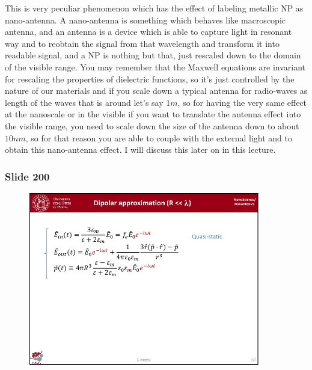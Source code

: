 \documentclass[../main/main.tex]{subfiles}
\begin{document}
This is very peculiar phenomenon which has the effect of labeling metallic NP as nano-antenna. A nano-antenna is something which behaves like macroscopic antenna, and an antenna is a device which is able to capture light in resonant way and to reobtain the signal from that wavelength and transform it into readable signal, and a NP is nothing but that, just rescaled down to the domain of the visible range. You may remember that the Maxwell equations are invariant for rescaling the properties of dielectric functions, so it's just controlled by the nature of our materials and if you scale down a typical antenna for radio-waves as length of the waves that is around let's say $1 m$, so for having the very same effect at the nanoscale or in the visible if you want to translate the antenna effect into the visible range, you need to scale down the size of the antenna down to about $10 nm$, so for that reason you are able to couple with the external light and to obtain this nano-antenna effect. I will discuss this later on in this lecture.



\newpage

\subsubsection{Slide 200}

\begin{figure}[h!]
\centering
\includegraphics[page=4,width=0.9\textwidth]{../lessons/pdf_file/12_lesson.pdf}
\end{figure}
\end{document}
